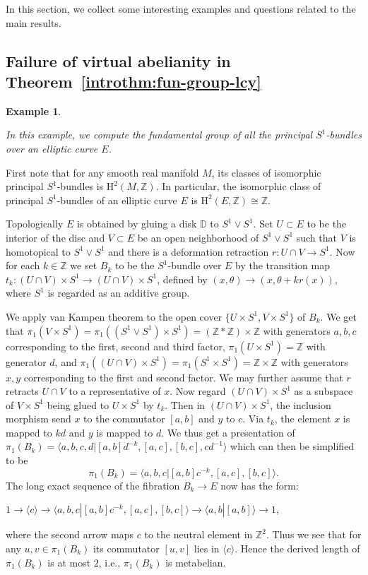 \documentclass{amsart}
\theoremstyle{definition}
\newtheorem{example}[theorem]{Example}
\theoremstyle{remark}
\numberwithin{equation}{section}
\begin{document}
In this section, we collect some interesting examples and questions related to the main results.

\subsection{Failure of virtual abelianity in Theorem~\ref{introthm:fun-group-lcy}}

\begin{example}\label{ex:circle-over-elliptic}
{\em 
In this example, we compute the fundamental group of all the principal $S^1$-bundles over an elliptic curve $E$.

First note that for any smooth real manifold $M$, its classes of isomorphic principal $S^1$-bundles is $\mathrm{H}^2(M,\mathbb{Z})$. In particular, the isomorphic class of principal $S^1$-bundles of an elliptic curve $E$ is $\mathrm{H}^2(E,\mathbb{Z})\cong \mathbb{Z}$.

Topologically $E$ is obtained by gluing a disk $\mathbb{D}$ to $S^1\vee S^1$. Set $U\subset E$ to be the interior of the disc and $V\subset E$ be an open neighborhood of $S^1\vee S^1$ such that $V$ is homotopical to $S^1\vee S^1$ and there is a deformation retraction $r:U\cap V\rightarrow S^1$.
Now for each $k\in \mathbb{Z}$ we set $B_k$ to be the $S^1$-bundle over $E$ by the transition map $t_k:(U\cap V)\times S^1\rightarrow (U\cap V)\times S^1$, 
defined by $(x,\theta)\rightarrow (x,\theta+kr(x))$, where $S^1$ is regarded as an additive group. 

We apply van Kampen theorem to the open cover $\{U\times S^1, V\times S^1\}$ of $B_k$. We get that $\pi_1(V\times S^1)=\pi_1((S^1\vee S^1)\times S^1)=(\mathbb{Z}\ast\mathbb{Z})\times \mathbb{Z}$ with generators $a,b,c$ corresponding to the first, second and third factor, $\pi_1(U\times S^1)=\mathbb{Z}$ with generator $d$,  and $\pi_1((U\cap V)\times S^1)=\pi_1(S^1\times S^1)=\mathbb{Z}\times \mathbb{Z}$ with generators $x,y$ corresponding to the first and second factor. We may further assume that $r$ retracts $U\cap V$ to a representative of $x$. Now regard $(U\cap V)\times S^1$ as a subspace of $V\times S^1$ being glued to $U\times S^1$ by $t_k$. Then in $(U\cap V)\times S^1$, the inclusion morphism send $x$ to the commutator $[a,b]$ and $y$ to $c$. Via $t_k$, the element $x$ is mapped to $kd$ and $y$ is mapped to $d$. We thus get a presentation of $\pi_1(B_k)=\langle a,b,c,d|[a,b]d^{-k},[a,c],[b,c],cd^{-1}\rangle$ which can then be simplified to be 
\begin{equation*}
    \pi_1(B_k)=\langle a,b,c|[a,b]c^{-k},[a,c],[b,c]\rangle.
\end{equation*}
The long exact sequence of the fibration $B_k\rightarrow E$ now has the form:
\begin{center}
    $1\rightarrow \langle c\rangle \rightarrow \langle a,b,c|[a,b]c^{-k},[a,c],[b,c]\rangle \rightarrow \langle a,b|[a,b] \rangle \rightarrow 1$,
\end{center}
where the second arrow maps $c$ to the neutral element in $\mathbb{Z}^2$. Thus we see that for any $u,v\in \pi_1(B_k)$ its commutator $[u,v]$ lies in $\langle c\rangle$. Hence the derived length of $\pi_1(B_k)$ is at most $2$, i.e., $\pi_1(B_k)$ is metabelian.

}
\end{example}
\end{document}
